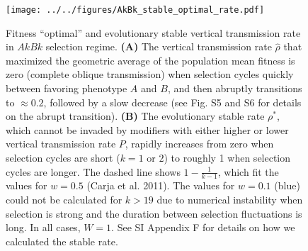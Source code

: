 \documentclass[9pt,twocolumn,twoside,lineno]{pnas-new}
\begin{document}
\begin{figure}[h]
\centering
\texttt{[image: ../../figures/AkBk\_stable\_optimal\_rate.pdf]}
\caption{Fitness ``optimal'' and evolutionary stable vertical transmission rate in $AkBk$ selection regime. 
\textbf{(A)} The vertical transmission rate $\hat{\rho}$ that maximized the geometric average of the population mean fitness is zero (complete oblique transmission) when selection cycles quickly between favoring phenotype $A$ and $B$, and then abruptly transitions to $\approx 0.2$, followed by a slow decrease (see Fig. S5 and S6 for details on the abrupt transition).
\textbf{(B)} The evolutionary stable rate $\rho^*$, which cannot be invaded by modifiers with either higher or lower vertical transmission rate $P$, rapidly increases from zero when selection cycles are short ($k=1$ or $2$) to roughly 1 when selection cycles are longer.
The dashed line shows $1-\frac{1}{k-1}$, which fit the values for $w=0.5$ (Carja et al. 2011). The values for $w=0.1$ (blue) could not be calculated for $k > 19$ due to numerical instability when selection is strong and the duration between selection fluctuations is long.
In all cases, $W=1$. See SI Appendix F for details on how we calculated the stable rate.}\label{fig:AkBk_stable_optimal_rate}
\end{figure}
\end{document}
